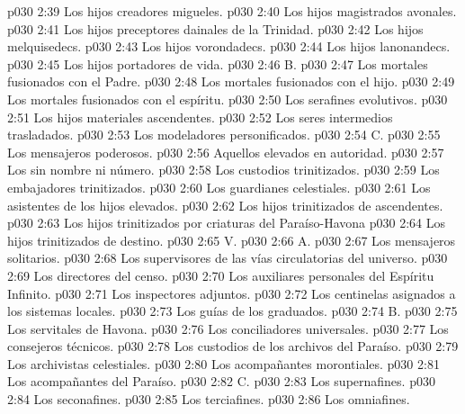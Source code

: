 \vs p030 2:39 Los hijos creadores migueles.
\vs p030 2:40 Los hijos magistrados avonales.
\vs p030 2:41 Los hijos preceptores dainales de la Trinidad.
\vs p030 2:42 Los hijos melquisedecs.
\vs p030 2:43 Los hijos vorondadecs.
\vs p030 2:44 Los hijos lanonandecs.
\vs p030 2:45 Los hijos portadores de vida.
\vs p030 2:46 \pc B. 
\vs p030 2:47 Los mortales fusionados con el Padre.
\vs p030 2:48 Los mortales fusionados con el hijo.
\vs p030 2:49 Los mortales fusionados con el espíritu.
\vs p030 2:50 Los serafines evolutivos.
\vs p030 2:51 Los hijos materiales ascendentes.
\vs p030 2:52 Los seres intermedios trasladados.
\vs p030 2:53 Los modeladores personificados.
\vs p030 2:54 \pc C. 
\vs p030 2:55 Los mensajeros poderosos.
\vs p030 2:56 Aquellos elevados en autoridad.
\vs p030 2:57 Los sin nombre ni número.
\vs p030 2:58 Los custodios trinitizados.
\vs p030 2:59 Los embajadores trinitizados.
\vs p030 2:60 Los guardianes celestiales.
\vs p030 2:61 Los asistentes de los hijos elevados.
\vs p030 2:62 Los hijos trinitizados de ascendentes.
\vs p030 2:63 Los hijos trinitizados por criaturas del Paraíso\hyp{}Havona
\vs p030 2:64 Los hijos trinitizados de destino.
\vs p030 2:65 \pc V. 
\vs p030 2:66 \pc A. 
\vs p030 2:67 Los mensajeros solitarios.
\vs p030 2:68 Los supervisores de las vías circulatorias del universo.
\vs p030 2:69 Los directores del censo.
\vs p030 2:70 Los auxiliares personales del Espíritu Infinito.
\vs p030 2:71 Los inspectores adjuntos.
\vs p030 2:72 Los centinelas asignados a los sistemas locales.
\vs p030 2:73 Los guías de los graduados.
\vs p030 2:74 \pc B. 
\vs p030 2:75 Los servitales de Havona.
\vs p030 2:76 Los conciliadores universales.
\vs p030 2:77 Los consejeros técnicos.
\vs p030 2:78 Los custodios de los archivos del Paraíso.
\vs p030 2:79 Los archivistas celestiales.
\vs p030 2:80 Los acompañantes morontiales.
\vs p030 2:81 Los acompañantes del Paraíso.
\vs p030 2:82 \pc C. 
\vs p030 2:83 Los supernafines.
\vs p030 2:84 Los seconafines.
\vs p030 2:85 Los terciafines.
\vs p030 2:86 Los omniafines.
